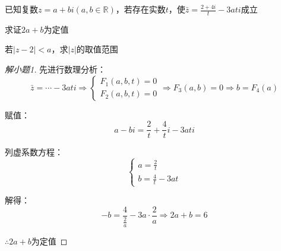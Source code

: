 \begin{example}
	已知复数$z=a+bi(a,b\in\mathbb{R})$，若存在实数$t$，使$\bar{z}=\frac{2+4i}{t}-3ati$成立
	\begin{enumlist}
	\item 求证$2a+b$为定值
	\item 若$\lvert z-2\rvert<a$，求$\lvert z\rvert$的取值范围
	\end{enumlist}
\end{example}
\begin{proof}[解小题1]
		先进行数理分析：
			\[\bar{z}=\cdots-3ati\Rightarrow
			\begin{cases}
				F_1(a,b,t)=0 \\
				F_2(a,b,t)=0
			\end{cases}
			\Rightarrow F_3(a,b)=0\Rightarrow b=F_4(a)
			\]

		赋值：\[a-bi=\frac{2}{t}+\frac{4}{t}i-3ati\]

		列虚系数方程：
		\[\begin{cases}
			a=\frac{2}{t} \\
			b=\frac{4}{t}-3at
		\end{cases}\]

		解得：
		\[-b=\frac{4}{\frac{2}{a}}-3a\cdot\frac{2}{a}\Rightarrow2a+b=6\]

		$\therefore2a+b$为定值
\end{proof}
